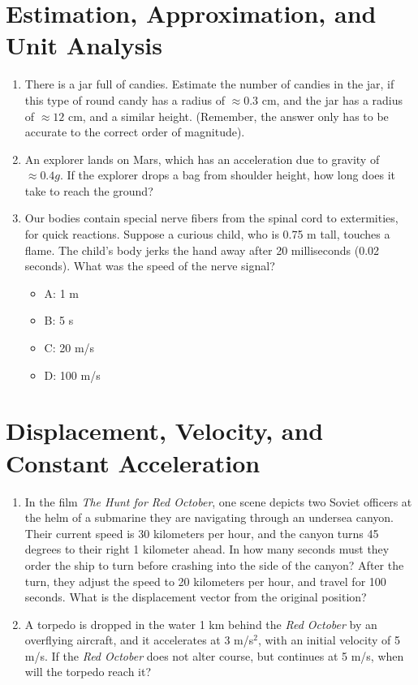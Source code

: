 \documentclass[10pt]{article}
\begin{document}
\maketitle

\section{Estimation, Approximation, and Unit Analysis}
\begin{enumerate}
\item There is a jar full of candies.  Estimate the number of candies in the jar, if this type of round candy has a radius of $\approx 0.3$ cm, and the jar has a radius of $\approx 12$ cm, and a similar height.  (Remember, the answer only has to be accurate to the correct order of magnitude). \vspace{1.5 cm}
\item An explorer lands on Mars, which has an acceleration due to gravity of $\approx 0.4 g$.  If the explorer drops a bag from shoulder height, how long does it take to reach the ground? \vspace{1.5 cm}
\item Our bodies contain special nerve fibers from the spinal cord to extermities, for quick reactions.  Suppose a curious child, who is 0.75 m tall, touches a flame.  The child's body jerks the hand away after 20 milliseconds (0.02 seconds).  What was the speed of the nerve signal? \\
\begin{itemize}
\item A: 1 m
\item B: 5 s
\item C: 20 m/s
\item D: 100 m/s
\end{itemize}
\end{enumerate}
\section{Displacement, Velocity, and Constant Acceleration}
\begin{enumerate}
\item In the film \textit{The Hunt for Red October}, one scene depicts two Soviet officers at the helm of a submarine they are navigating through an undersea canyon.  Their current speed is 30 kilometers per hour, and the canyon turns 45 degrees to their right 1 kilometer ahead.  In how many seconds must they order the ship to turn before crashing into the side of the canyon?  After the turn, they adjust the speed to 20 kilometers per hour, and travel for 100 seconds.  What is the displacement vector from the original position?\vspace{3cm}
\item A torpedo is dropped in the water 1 km behind the \textit{Red October} by an overflying aircraft, and it accelerates at 3 m/s$^2$, with an initial velocity of 5 m/s.  If the \textit{Red October} does not alter course, but continues at 5 m/s, when will the torpedo reach it?\vspace{3cm}
\end{enumerate}
\end{document}
